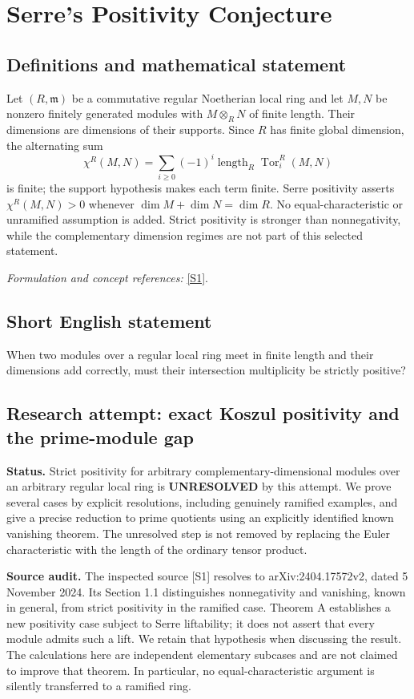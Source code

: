 \documentclass[11pt]{article}
\begin{document}
\section*{\texorpdfstring{Serre's Positivity Conjecture}{Serre's Positivity Conjecture}}\label{statement}
\subsection{Definitions and mathematical statement}
Let $(R,\mathfrak m)$ be a commutative regular Noetherian local ring and let $M,N$ be nonzero finitely generated modules with $M\otimes_RN$ of finite length. Their dimensions are dimensions of their supports. Since $R$ has finite global dimension, the alternating sum
\[
 \chi^R(M,N)=\sum_{i\ge0}(-1)^i
 \operatorname{length}_R\operatorname{Tor}_i^R(M,N)
\]
is finite; the support hypothesis makes each term finite. Serre positivity asserts $\chi^R(M,N)>0$ whenever $\dim M+\dim N=\dim R$. No equal-characteristic or unramified assumption is added. Strict positivity is stronger than nonnegativity, while the complementary dimension regimes are not part of this selected statement.
\par\smallskip\textit{Formulation and concept references:} \href{https://arxiv.org/html/2404.17572}{[S1]}.

\subsection{Short English statement}
When two modules over a regular local ring meet in finite length and their dimensions add correctly, must their intersection multiplicity be strictly positive?
\subsection{Research attempt: exact Koszul positivity and the prime-module gap}
\textbf{Status.} Strict positivity for arbitrary complementary-dimensional modules over an arbitrary regular local ring is \textbf{UNRESOLVED} by this attempt. We prove several cases by explicit resolutions, including genuinely ramified examples, and give a precise reduction to prime quotients using an explicitly identified known vanishing theorem. The unresolved step is not removed by replacing the Euler characteristic with the length of the ordinary tensor product.

\textbf{Source audit.} The inspected source [S1] resolves to arXiv:2404.17572v2, dated 5 November 2024. Its Section 1.1 distinguishes nonnegativity and vanishing, known in general, from strict positivity in the ramified case. Theorem A establishes a new positivity case subject to Serre liftability; it does not assert that every module admits such a lift. We retain that hypothesis when discussing the result. The calculations here are independent elementary subcases and are not claimed to improve that theorem. In particular, no equal-characteristic argument is silently transferred to a ramified ring.
\end{document}
